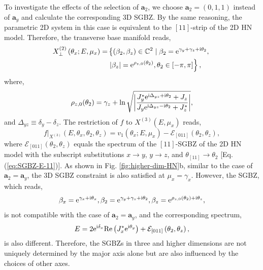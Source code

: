 To investigate the effects of the selection of $\mathbf{a}_{2}$,
we choose $\mathbf{a}_{2}=(0,1,1)$ instead of $\mathbf{a}_{y}$ and
calculate the corresponding 3D SGBZ. By the same reasoning, the parametric
2D system in this case is equivalent to the $[11]$-strip of the 2D
HN model. Therefore, the transverse base manifold reads, 
\begin{align}
X_{\perp}^{(2)}\left(\theta_{x};E,\mu_{x}\right)= & \left\{ \left(\beta_{2},\beta_{z}\right)\in\mathbb{C}^{2}\mid\beta_{2}=\mathrm{e}^{\gamma_{y}+\gamma_{z}+\mathrm{i}\theta_{2}},\right.\nonumber \\
 & \left.\left|\beta_{z}\right|=\mathrm{e}^{\rho_{z,0}(\theta_{2})},\theta_{2}\in[-\pi,\pi]\right\} ,
\end{align}
where, 
\begin{equation}
\rho_{z,0}(\theta_{2})=\gamma_{z}+\ln\sqrt{\left|\frac{J_{y}^{*}\mathrm{e}^{\mathrm{i}\Delta_{yz}+\mathrm{i}\theta_{2}}+J_{z}}{J_{y}\mathrm{e}^{\mathrm{i}\Delta_{yz}-\mathrm{i}\theta_{2}}+J_{z}^{*}}\right|},
\end{equation}
and $\Delta_{yz}\equiv\delta_{y}-\delta_{z}$. The restriction of
$f$ to $X^{(3)}(E,\mu_{x})$ reads, 
\begin{equation}
f|_{X^{(3)}}\left(E,\theta_{x},\theta_{2},\theta_{z}\right)=v_{1}\left(\theta_{x};E,\mu_{x}\right)-\mathcal{E}_{[011]}\left(\theta_{2},\theta_{z}\right),
\end{equation}
where $\mathcal{E}_{[011]}(\theta_{2},\theta_{z})$ equals the spectrum
of the $[11]$-SGBZ of the 2D HN model with the subscript substitutions
$x\rightarrow y$, $y\rightarrow z$, and $\theta_{[11]}\rightarrow\theta_{2}$
{[}Eq. (\ref{eq:SGBZ-E-11}){]}. As shown in Fig. \ref{fig:higher-dim-HN}b,
similar to the case of $\mathbf{a}_{2}=\mathbf{a}_{y}$, the 3D SGBZ
constraint is also satisfied at $\mu_{x}=\gamma_{x}$. However, the
SGBZ, which reads, 
\begin{equation}
\beta_{x}=\mathrm{e}^{\gamma_{x}+\mathrm{i}\theta_{x}},\beta_{2}=\mathrm{e}^{\gamma_{y}+\gamma_{z}+\mathrm{i}\theta_{2}},\beta_{z}=\mathrm{e}^{\rho_{z,0}(\theta_{2})+\mathrm{i}\theta_{z}},
\end{equation}
is not compatible with the case of $\mathbf{a}_{2}=\mathbf{a}_{y}$,
and the corresponding spectrum, 
\begin{equation}
E=2\mathrm{e}^{\mathrm{i}\delta_{x}}\text{Re}\left(J_{x}^{*}\mathrm{e}^{\mathrm{i}\theta_{y}}\right)+\mathcal{E}_{[011]}\left(\theta_{2},\theta_{z}\right),
\end{equation}
is also different. Therefore, the SGBZs in three and higher dimensions
are not uniquely determined by the major axis alone but are also influenced
by the choices of other axes.

